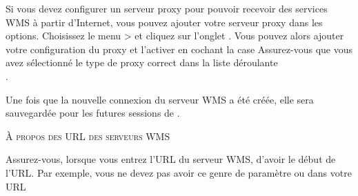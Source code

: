 Si vous devez configurer un serveur proxy pour pouvoir recevoir des services
WMS à partir d'Internet, vous pouvez ajouter votre serveur proxy dans les
options. Choisissez le menu  >
 et cliquez sur l'onglet
. Vous pouvez alors ajouter votre configuration du proxy et
l'activer en cochant la case 
Assurez-vous que vous avez sélectionné le type de proxy correct dans la liste 
déroulante\\ .

Une fois que la nouvelle connexion du serveur WMS a été créée, elle sera
sauvegardée pour les futures sessions de \qg.

\begin{Tip}[ht]\caption{\textsc{À propos des URL des serveurs WMS}}
Assurez-vous, lorsque vous entrez l'URL du serveur WMS, d'avoir le
début de l'URL. Par exemple, vous ne devez pas avoir ce genre de paramètre 
 ou 
dans votre URL
\end{Tip}



